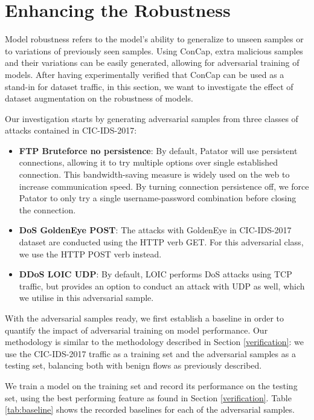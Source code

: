 \section{Enhancing the Robustness}\label{augmentation}
\FloatBarrier
Model robustness refers to the model's ability to generalize to unseen samples or to variations of previously seen samples. Using ConCap, extra malicious samples and their variations can be easily generated, allowing for adversarial training of models. After having experimentally verified that ConCap can be used as a stand-in for dataset traffic, in this section, we want to investigate the effect of dataset augmentation on the robustness of models. 

Our investigation starts by generating adversarial samples from three classes of attacks contained in CIC-IDS-2017:
\begin{itemize}
	\item \textbf{FTP Bruteforce no persistence}: By default, Patator will use persistent connections, allowing it to try multiple options over single established connection. This bandwidth-saving measure is widely used on the web to increase communication speed. By turning connection persistence off, we force Patator to only try a single username-password combination before closing the connection.
	\item \textbf{DoS GoldenEye POST}: The attacks with GoldenEye in CIC-IDS-2017 dataset are conducted using the HTTP verb GET. For this adversarial class, we use the HTTP POST verb instead.
	\item \textbf{DDoS LOIC UDP}: By default, LOIC performs DoS attacks using TCP traffic, but provides an option to conduct an attack with UDP as well, which we utilise in this adversarial sample.
\end{itemize}

With the adversarial samples ready, we first establish a baseline in order to quantify the impact of adversarial training on model performance. Our methodology is similar to the methodology described in Section \ref{verification}: we use the CIC-IDS-2017 traffic as a training set and the adversarial samples as a testing set, balancing both with benign flows as previously described. 

We train a model on the training set and record its performance on the testing set, using the best performing feature as found in Section \ref{verification}. Table \ref{tab:baseline} shows the recorded baselines for each of the adversarial samples.

